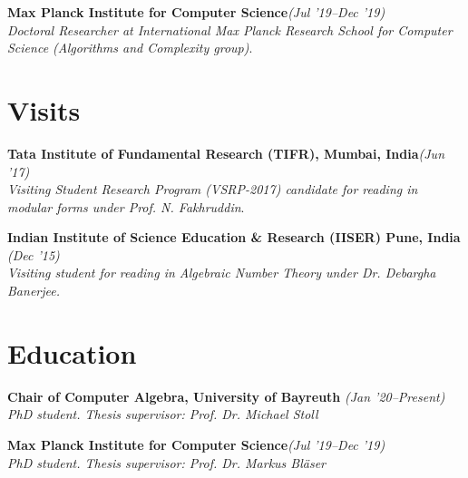 \documentclass[margin,line]{resume}
\begin{document}
\begin{resume}
    \textbf{Max Planck Institute for Computer Science}\hfill  \textit{(Jul '19--Dec '19)} \vspace{1mm}\\\vspace{1mm}%
    \textsl{Doctoral Researcher at International Max Planck Research School for Computer Science (Algorithms and Complexity group)}.
    \vspace{-7mm}\\\vspace{1mm}%
    
    
    \section{\mysidestyle Visits}
    \textbf{Tata Institute of Fundamental Research (TIFR), Mumbai, India}\hfill  \textit{(Jun '17)} \vspace{1mm}\\\vspace{1mm}%
    \textsl{Visiting Student Research Program (VSRP-2017) candidate for reading in modular forms under Prof. N. Fakhruddin}.
   \\\vspace{-6mm}%
    
    \textbf{Indian Institute of Science Education \& Research (IISER) Pune, India} \hfill \textit{ (Dec '15)} \vspace{1mm}\\\vspace{1mm}%
    \textsl{Visiting student for reading in Algebraic Number Theory under Dr. Debargha Banerjee.} \vspace{-7mm}\\\vspace{1mm}%
    
    \section{\mysidestyle Education}
    \textbf{Chair of Computer Algebra, University of Bayreuth} \hfill \textit{ (Jan '20--Present)} \vspace{1mm}\\\vspace{1mm}%
    \textsl{PhD student. Thesis supervisor: Prof. Dr. Michael Stoll}\\\vspace{-6mm}
    
    \textbf{Max Planck Institute for Computer Science}\hfill  \textit{(Jul '19--Dec '19)} \vspace{1mm}\\\vspace{1mm}
    \textsl{PhD student. Thesis supervisor: Prof. Dr. Markus Bl\"{a}ser}\vspace{-7mm}\\\vspace{1mm}
    


\end{resume}
\end{document}
